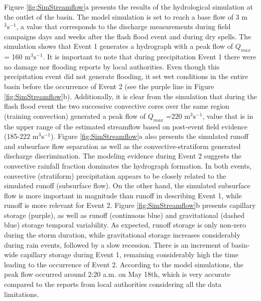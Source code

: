 \documentclass[hess, manuscript]{copernicus}
\begin{document}
Figure \ref{fig:SimStreamflow}a presents the results of the hydrological simulation at the outlet of the basin.  The model simulation is set to reach a base flow of 3 m$^3 \text{s}^{-1}$, a value that corresponds to the discharge measurements during field campaigns days and weeks after the flash flood event and during dry spells.   The simulation shows that Event 1 generates a hydrograph with a peak flow of $Q_{max}$ = 160 m$^3 \text{s}^{-1}$. It is important to note that during precipitation Event 1 there were no damage nor flooding reports by local authorities. Even though this precipitation event did not generate  flooding, it set wet conditions in the entire basin before the occurrence of Event 2  (see the purple line in Figure \ref{fig:SimStreamflow}b). Additionally,  it is clear from the simulation that during the flash flood event the two successive convective cores over the same region (training convection) generated a peak flow of $Q_{max}$ =220 m$^3 \text{s}^{-1}$, value that is in the upper range of the estimated streamflow based on post-event field evidence (185-222 m$^3 \text{s}^{-1}$). Figure \ref{fig:SimStreamflow}a also presents the simulated runoff and subsurface flow separation as well as the convective-stratiform generated discharge discrimination.  The modeling evidence during Event 2 suggests the convective rainfall fraction dominates the hydrograph formation. In both events, convective (stratiform) precipitation appears to be closely related to the simulated runoff (subsurface flow).  On the other hand, the simulated subsurface flow is more important in magnitude than runoff in describing Event 1, while runoff is more relevant for Event 2. Figure \ref{fig:SimStreamflow}b presents capillary storage (purple), as well as runoff (continuous blue) and gravitational (dashed blue) storage temporal variability.  As expected, runoff storage is only non-zero during the storm duration, while gravitational storage increases considerably during rain events, followed by a slow recession.  There is an increment of basin-wide capillary storage during Event 1, remaining considerably high the time leading to the occurrence of Event 2. According to the model simulations, the peak flow occurred around 2:20 a.m. on May 18th, which is very accurate compared to the reports from local authorities considering all the data limitations.\\
\end{document}
